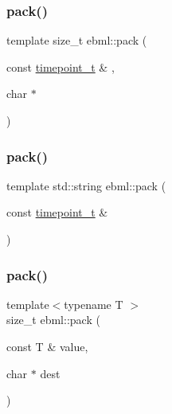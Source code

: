 \subsubsection{\texorpdfstring{pack()}{pack()}\hspace{0.1cm}{\footnotesize\ttfamily [20/24]}}
{\footnotesize\ttfamily template size\+\_\+t ebml\+::pack (\begin{DoxyParamCaption}\item[{const \mbox{\hyperlink{namespaceebml_a7e667ec3fe8b51fb5b8f9690734d8638}{timepoint\+\_\+t}} \&}]{,  }\item[{char $\ast$}]{ }\end{DoxyParamCaption})}

\mbox{\label{namespaceebml_a5f46d1f43787604ff84e25a0115d08cd}} 
\subsubsection{\texorpdfstring{pack()}{pack()}\hspace{0.1cm}{\footnotesize\ttfamily [21/24]}}
{\footnotesize\ttfamily template std\+::string ebml\+::pack (\begin{DoxyParamCaption}\item[{const \mbox{\hyperlink{namespaceebml_a7e667ec3fe8b51fb5b8f9690734d8638}{timepoint\+\_\+t}} \&}]{ }\end{DoxyParamCaption})}

\mbox{\label{namespaceebml_a902c75e723a22780c779a3fc1531a07f}} 
\subsubsection{\texorpdfstring{pack()}{pack()}\hspace{0.1cm}{\footnotesize\ttfamily [22/24]}}
{\footnotesize\ttfamily template$<$typename T $>$ \\
size\+\_\+t ebml\+::pack (\begin{DoxyParamCaption}\item[{const T \&}]{value,  }\item[{char $\ast$}]{dest }\end{DoxyParamCaption})}

\mbox{\label{namespaceebml_a2ca9fdcd493e677f02886593a4ae63e0}} 
